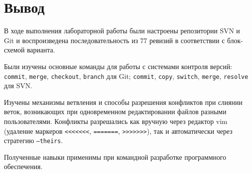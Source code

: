 \documentclass[12pt,a4paper]{article}
\begin{document}
\newpage
\section{Вывод}

В ходе выполнения лабораторной работы были настроены репозитории SVN и Git
и воспроизведена последовательность из 77 ревизий в соответствии с блок-схемой варианта.

Были изучены основные команды для работы с системами контроля версий:
\texttt{commit}, \texttt{merge}, \texttt{checkout}, \texttt{branch} для Git;
\texttt{commit}, \texttt{copy}, \texttt{switch}, \texttt{merge}, \texttt{resolve} для SVN.

Изучены механизмы ветвления и способы разрешения конфликтов при слиянии веток,
возникающих при одновременном редактировании файлов разными пользователями.
Конфликты разрешались как вручную через редактор vim (удаление маркеров \texttt{<<<<<<<},
\texttt{=======}, \texttt{>>>>>>>}), так и автоматически через стратегию \texttt{--theirs}.

Полученные навыки применимы при командной разработке программного обеспечения.
\end{document}

